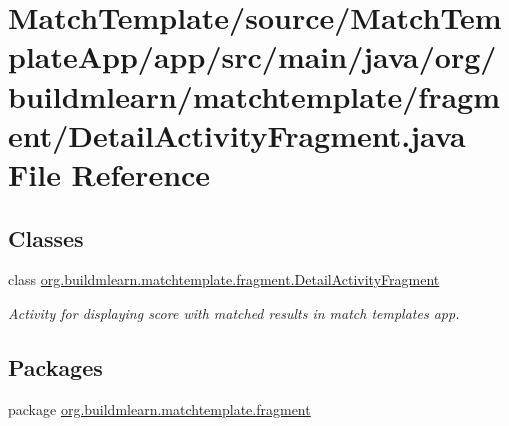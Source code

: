 \hypertarget{MatchTemplate_2source_2MatchTemplateApp_2app_2src_2main_2java_2org_2buildmlearn_2matchtemplate_214ffae52d596ba7c06cdf792c03758c2}{}\section{Match\+Template/source/\+Match\+Template\+App/app/src/main/java/org/buildmlearn/matchtemplate/fragment/\+Detail\+Activity\+Fragment.java File Reference}
\label{MatchTemplate_2source_2MatchTemplateApp_2app_2src_2main_2java_2org_2buildmlearn_2matchtemplate_214ffae52d596ba7c06cdf792c03758c2}
\subsection*{Classes}
\begin{DoxyCompactItemize}
\item 
class \hyperlink{classorg_1_1buildmlearn_1_1matchtemplate_1_1fragment_1_1DetailActivityFragment}{org.\+buildmlearn.\+matchtemplate.\+fragment.\+Detail\+Activity\+Fragment}
\begin{DoxyCompactList}\small\item\em Activity for displaying score with matched results in match template\textquotesingle{}s app. \end{DoxyCompactList}\end{DoxyCompactItemize}
\subsection*{Packages}
\begin{DoxyCompactItemize}
\item 
package \hyperlink{namespaceorg_1_1buildmlearn_1_1matchtemplate_1_1fragment}{org.\+buildmlearn.\+matchtemplate.\+fragment}
\end{DoxyCompactItemize}
